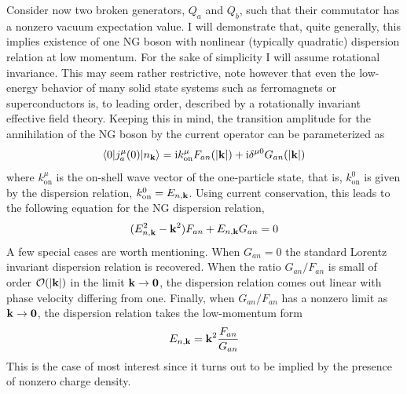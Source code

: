 \documentclass[final,2p,times,12pt,sort&compress]{elsarticle}
\newcommand\vek[1]{{\boldsymbol{\bf #1}}}   %
\newcommand\bra[1]{\langle#1\vert}          %
\newcommand\ket[1]{\vert#1\rangle}          %
\newcommand\imag{\mathrm i}                 %
\newcommand\abs[1]{\left|#1\right|}         %
\begin{document}
Consider now two broken generators, $Q_a$ and $Q_b$, such that their commutator
has a nonzero vacuum expectation value. I will demonstrate that, quite
generally, this implies existence of one NG boson with nonlinear (typically
quadratic) dispersion relation at low momentum. For the sake of simplicity I
will assume rotational invariance. This may seem rather restrictive, note
however that even the low-energy behavior of many solid state systems such as
ferromagnets or superconductors is, to leading order, described by a
rotationally invariant effective field theory. Keeping this in mind, the
transition amplitude for the annihilation of the NG boson by the current
operator can be parameterized as
\begin{equation}
\bra0j^\mu_a(0)\ket{n_{\vek k}}=\imag k^\mu_{\text{on}} F_{an}(\abs{\vek
k})+\imag\delta^{\mu0}G_{an}(\abs{\vek k})
\label{current_amplitude}
\end{equation}
where $k^\mu_{\text{on}}$ is the on-shell wave vector of the one-particle
state, that is, $k^0_{\text{on}}$ is given by the dispersion relation,
$k^0_{\text{on}}=E_{n,\vek k}$. Using current conservation, this leads to the
following equation for the NG dispersion relation,
\begin{equation}
(E^2_{n,\vek k}-\vek k^2)F_{an}+E_{n,\vek k}G_{an}=0
\label{typeIIGBdisp}
\end{equation}
A few special cases  are worth mentioning. When $G_{an}=0$ the standard Lorentz
invariant dispersion relation is recovered. When the ratio $G_{an}/F_{an}$ is
small of order $\mathcal O(\abs{\vek k})$ in the limit $\vek k\to\vek0$, the
dispersion relation comes out linear with phase velocity differing from one.
Finally, when $G_{an}/F_{an}$ has a nonzero limit as $\vek k\to\vek0$, the
dispersion relation takes the low-momentum form
\begin{equation}
E_{n,\vek k}=\vek k^2\frac{F_{an}}{G_{an}}
\label{typeIIGBdisplowk}
\end{equation}
This is the case of most interest since it turns out to be implied by the
presence of nonzero charge density.
\end{document}
